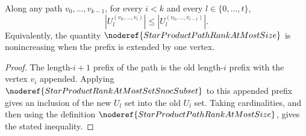 \begin{lemma}
Along any path \(v_0,\ldots,v_{k-1}\), for every \(i<k\) and every
\(l\in\{0,\ldots,t\}\),
\[
  |U_l^{(v_0,\ldots,v_i)}|\le |U_l^{(v_0,\ldots,v_{i-1})}|.
\]
Equivalently, the quantity \(\noderef{StarProductPathRankAtMostSize}\) is
nonincreasing when the prefix is extended by one vertex.
\end{lemma}
\begin{proof}
The length-\(i+1\) prefix of the path is the old length-\(i\) prefix with the
vertex \(v_i\) appended.  Applying
\(\noderef{StarProductRankAtMostSetSnocSubset}\) to this appended prefix gives
an inclusion of the new \(U_l\) set into the old \(U_l\) set.  Taking
cardinalities, and then using the definition
\(\noderef{StarProductPathRankAtMostSize}\), gives the stated inequality.
\end{proof}
